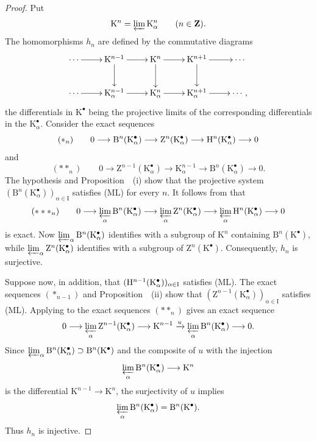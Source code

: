 \begin{proof}
Put
\[
  \mathrm{K}^n=\varprojlim\mathrm{K}^n_\alpha
  \qquad(n\in\mathbf{Z}).
\]
The homomorphisms $h_n$ are defined by the commutative diagrams
\[
  \xymatrix{
    \cdots\ar[r]
      & \mathrm{K}^{n-1}\ar[r]\ar[d]
      & \mathrm{K}^n\ar[r]\ar[d]
      & \mathrm{K}^{n+1}\ar[r]\ar[d]
      & \cdots\\
    \cdots\ar[r]
      & \mathrm{K}^{n-1}_\alpha\ar[r]
      & \mathrm{K}^n_\alpha\ar[r]
      & \mathrm{K}^{n+1}_\alpha\ar[r]
      & \cdots,
  }
\]
the differentials in $\mathrm{K}^\bullet$ being the projective limits
of the corresponding differentials in the
$\mathrm{K}^\bullet_\alpha$.
Consider the exact sequences
\[
  (*_n)\qquad
  0\longrightarrow
  \mathrm{B}^n(\mathrm{K}^\bullet_\alpha)
  \longrightarrow
  \mathrm{Z}^n(\mathrm{K}^\bullet_\alpha)
  \longrightarrow
  \mathrm{H}^n(\mathrm{K}^\bullet_\alpha)
  \longrightarrow0
\]
and
\[
  (**_n)\qquad
  0\longrightarrow
  \mathrm{Z}^{n-1}(\mathrm{K}^\bullet_\alpha)
  \longrightarrow
  \mathrm{K}^{n-1}_\alpha
  \longrightarrow
  \mathrm{B}^n(\mathrm{K}^\bullet_\alpha)
  \longrightarrow0.
\]
The hypothesis and Proposition~~(i) show that the
projective system
$(\mathrm{B}^n(\mathrm{K}^\bullet_\alpha))_{\alpha\in\mathrm{I}}$
satisfies (ML) for every $n$.
It follows from  that
\[
  (***_n)\qquad
  0\longrightarrow
  \varprojlim_\alpha\mathrm{B}^n(\mathrm{K}^\bullet_\alpha)
  \longrightarrow
  \varprojlim_\alpha\mathrm{Z}^n(\mathrm{K}^\bullet_\alpha)
  \longrightarrow
  \varprojlim_\alpha\mathrm{H}^n(\mathrm{K}^\bullet_\alpha)
  \longrightarrow0
\]
is exact.
Now
$\varprojlim_\alpha\mathrm{B}^n(\mathrm{K}^\bullet_\alpha)$
identifies with a subgroup of $\mathrm{K}^{n}$ containing
$\mathrm{B}^n(\mathrm{K}^\bullet)$, while
$\varprojlim_\alpha\mathrm{Z}^n(\mathrm{K}^\bullet_\alpha)$
identifies with a subgroup of $\mathrm{Z}^n(\mathrm{K}^\bullet)$.
Consequently, $h_n$ is surjective.

Suppose now, in addition, that
$(\mathrm{H}^{n-1}(\mathrm{K}^\bullet_\alpha))_{\alpha\in\mathrm{I}}$
satisfies (ML).
The exact sequences $(*_{n-1})$ and
Proposition~~(ii) show that
$(\mathrm{Z}^{n-1}(\mathrm{K}^\bullet_\alpha))_{\alpha\in\mathrm{I}}$
satisfies (ML).
Applying  to the exact sequences $(**_n)$ gives an
exact sequence
\[
  0\longrightarrow
  \varprojlim_\alpha
    \mathrm{Z}^{n-1}(\mathrm{K}^\bullet_\alpha)
  \longrightarrow
  \mathrm{K}^{n-1}
  \xrightarrow{u}
  \varprojlim_\alpha
    \mathrm{B}^n(\mathrm{K}^\bullet_\alpha)
  \longrightarrow0.
\]
Since
$\varprojlim_\alpha\mathrm{B}^n(\mathrm{K}^\bullet_\alpha)
\supset\mathrm{B}^n(\mathrm{K}^\bullet)$
and the composite of $u$ with the injection
\[
  \varprojlim_\alpha\mathrm{B}^n(\mathrm{K}^\bullet_\alpha)
  \longrightarrow\mathrm{K}^n
\]
is the differential
$\mathrm{K}^{n-1}\longrightarrow\mathrm{K}^n$, the surjectivity of
$u$ implies
\[
  \varprojlim_\alpha\mathrm{B}^n(\mathrm{K}^\bullet_\alpha)
  =
  \mathrm{B}^n(\mathrm{K}^\bullet).
\]
Thus $h_n$ is injective.
\end{proof}

